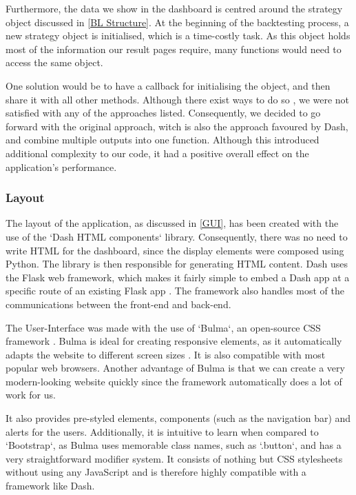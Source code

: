 \documentclass[main.tex]{subfiles}
\begin{document}
Furthermore, the data we show in the dashboard is centred around the strategy object discussed in \ref{BL Structure}. At the beginning of the backtesting process, a new strategy object is initialised, which is a time-costly task. As this object holds most of the information our result pages require, many functions would need to access the same object. 

One solution would be to have a callback for initialising the object, and then share it with all other methods. Although there exist ways to do so \cite{dash_share}, we were not satisfied with any of the approaches listed. Consequently, we decided to go forward with the original approach, witch is also the approach favoured by Dash, and combine multiple outputs into one function. Although this introduced additional complexity to our code, it had a positive overall effect on the application's performance.

\subsubsection*{Layout}

The layout of the application, as discussed in \ref{GUI}, has been created with the use of the `Dash HTML components` library. Consequently, there was no need to write HTML for the dashboard, since the display elements were composed using Python. The library is then responsible for generating HTML content. Dash uses the Flask web framework, which makes it fairly simple to embed a Dash app at a specific route of an existing Flask app \cite{flask-dash}. The framework also handles most of the communications between the front-end and back-end.

The User-Interface was made with the use of `Bulma`, an open-source CSS framework \cite{bulma}. Bulma is ideal for creating responsive elements, as it automatically adapts the website to different screen sizes \cite{responsiveness_2020}. It is also compatible with most popular web browsers. Another advantage of Bulma is that we can create a very modern-looking website quickly since the framework automatically does a lot of work for us.

It also provides pre-styled elements, components (such as the navigation bar) and alerts for the users. Additionally, it is intuitive to learn when compared to `Bootstrap`, as Bulma uses memorable class names, such as `.button`, and has a very straightforward modifier system. It consists of nothing but CSS stylesheets without using any JavaScript and is therefore highly compatible with a framework like Dash.
\end{document}
